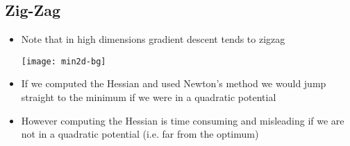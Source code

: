 \begin{slide}
\section[-2]{Zig-Zag}

\begin{PauseHighLight}
  \begin{itemize}
  \item Note that in high dimensions gradient descent tends to zigzag
    \begin{center}
      \texttt{[image: min2d-bg]}\pause
      \pause
    \end{center}
  \item If we computed the Hessian and used Newton's method we would
    jump straight to the minimum if we were in a quadratic potential\pause
  \item However computing the Hessian is time consuming and misleading
    if we are not in a quadratic potential (i.e. far from the optimum)\pause
  \end{itemize}
\end{PauseHighLight}

\end{slide}



